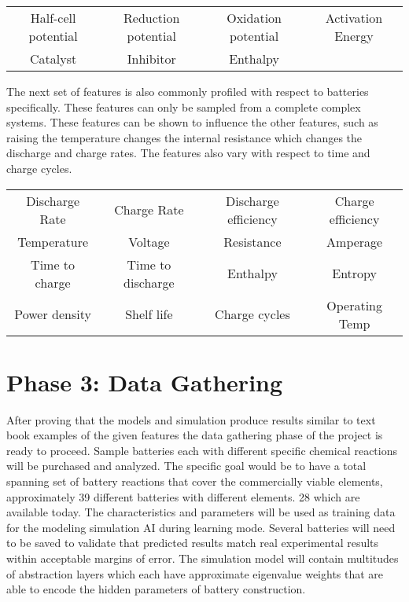 \documentclass[10pt]{article}
\begin{document}
 \noindent
 \begin{tabular}{| c c c c|}
 	\hline
 	Half-cell potential & Reduction potential & Oxidation potential & Activation Energy \\
 	Catalyst & Inhibitor & Enthalpy & \\
 	\hline
 \end{tabular}
 

The next set of features is also commonly profiled with respect to batteries specifically. These features can only be sampled from a complete complex systems. These features can be shown to influence the other features, such as raising the temperature changes the internal resistance which changes the discharge and charge rates. The features also vary with respect to time and charge cycles.\\

\noindent
\begin{tabular}{| c c c c|}
	\hline
	Discharge Rate & Charge Rate & Discharge efficiency & Charge efficiency \\
	Temperature & Voltage & Resistance & Amperage \\
	Time to charge & Time to discharge & Enthalpy & Entropy\\
	Power density & Shelf life & Charge cycles & Operating Temp \\
	\hline
\end{tabular}	
	



\section{Phase 3: Data Gathering}
After proving that the models and simulation produce results similar to text book examples of the given features the data gathering phase of the project is ready to proceed.  Sample batteries each with different specific chemical reactions will be purchased and analyzed. The specific goal would be to have a total spanning set of battery reactions that cover the commercially viable elements, approximately 39 different batteries with different elements. 28 which are available today. The characteristics and parameters will be used as training data for the modeling simulation AI during learning mode. Several batteries will need to be saved to validate that predicted results match real experimental results within acceptable margins of error. The simulation model will contain multitudes of abstraction layers which each have approximate eigenvalue weights that are able to encode the hidden parameters of battery construction.  
\end{document}
